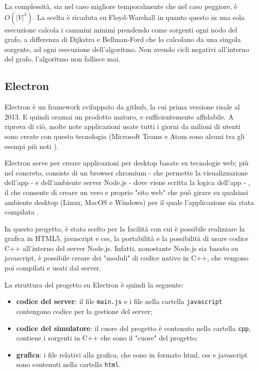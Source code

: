 \documentclass[main.tex]{subfiles}
\begin{document}
La complessità, sia nel caso migliore temporalmente che nel caso peggiore, è \(O(|V|^3)\).
La scelta è ricaduta su Floyd-Warshall in quanto questo in una sola esecuzione calcola i cammini minimi prendendo come sorgenti ogni nodo del grafo, a differenza di Dijkstra e Bellman-Ford che lo calcolano da una singola sorgente, ad ogni esecuzione dell'algoritmo.
Non avendo cicli negativi all'interno del grafo, l'algoritmo non fallisce mai.




\subsection{Electron}
Electron è un framework sviluppato da github, la cui prima versione risale al 2013. E quindi oramai un prodotto maturo, e sufficientemente affidabile. A riprova di ciò, molte note applicazioni usate tutti i giorni da milioni di utenti sono create con questa tecnologia (Microsoft Teams e Atom sono alcuni tra gli esempi più noti \cite{electronapps}).

Electron serve per creare applicazioni per desktop basate su tecnologie web; più nel concreto, consiste di un browser chromium - che permette la visualizzazione dell'app - e dell'ambiente server Node.js - dove viene scritta la logica dell'app - , il che consente di creare un vero e proprio "sito web" che può girare su qualsiasi ambiente desktop (Linux, MacOS e Windows) per il quale l'applicazione sia stata compilata \cite{electrondocs}. 

In questo progetto, è stato scelto per la facilità con cui è possibile realizzare la grafica in HTML5, javascript e css, la portabilità e la possibilità di usare codice C++ all'interno del server Node.js. Infatti, nonostante Node.js sia basato su javascript, è possibile creare dei "moduli" di codice nativo in C++, che vengono poi compilati e usati dal server. 

La struttura del progetto su Electron è quindi la seguente:
\begin{itemize}
    \item \textbf{codice del server}: il file \texttt{main.js} e i file nella cartella \texttt{javascript} contengono codice per la gestione del server;
    \item \textbf{codice del simulatore}: il cuore del progetto è contenuto nella cartella \texttt{cpp}, contiene i sorgenti in C++ che sono il "cuore" del progetto;
    \item \textbf{grafica}: i file relativi alla grafica, che sono in formato html, css e javascript sono contenuti nella cartella \texttt{html}.
\end{itemize}
\end{document}
